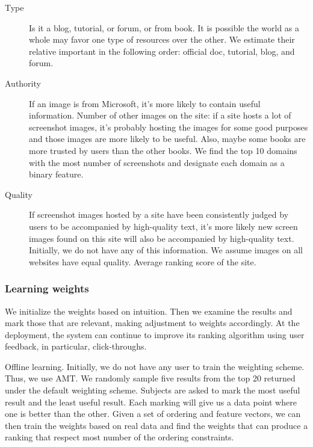 \documentclass{www2010-submission}
\begin{document}
\begin{description}

\item[Type]

Is it a blog, tutorial, or forum, or from book. It is possible the
world as a whole may favor one type of resources over the other.
We estimate their relative important in the following order:
official doc, tutorial, blog, and forum.

\item[Authority]

If an image is from Microsoft, it's more likely to contain useful
information. Number of other images on the site: if a site hosts a
lot of screenshot images, it's probably hosting the images for
some good purposes and those images are more likely to be useful.
Also, maybe some books are more trusted by users than the other
books. We find the top 10 domains with the most number of
screenshots and designate each domain as a binary feature.

\item[Quality]

If screenshot images hosted by a site have been consistently
judged by users to be accompanied by high-quality text, it's more
likely new screen images found on this site will also be
accompanied by high-quality text. Initially, we do not have any of
this information. We assume images on all websites have equal
quality. Average ranking score of the site.

\end{description}

\subsubsection{Learning weights}

We initialize the weights based on intuition. Then we examine the
results and mark those that are relevant, making adjustment to
weights accordingly. At the deployment, the system can continue to
improve its ranking algorithm using user feedback, in particular,
click-throughs.

Offline learning. Initially, we do not have any user to train the
weighting scheme. Thus, we use AMT. We randomly sample five
results from the top 20 returned under the default weighting
scheme.  Subjects are asked to mark the most useful result and the
least useful result. Each marking will give us a data point where
one is better than the other. Given a set of ordering and feature
vectors, we can then train the weights based on real data and find
the weights that can produce a ranking that respect most number of
the ordering constraints.
\end{document}

